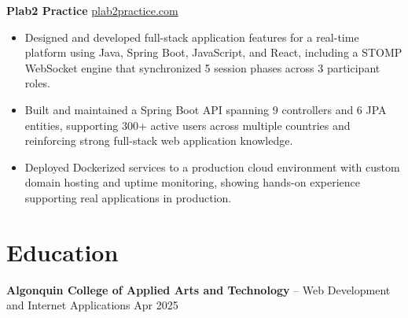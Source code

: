 \documentclass[11pt]{article}       %
\begin{document}
\textbf{Plab2 Practice} \hfill \href{https://plab2practice.com}{plab2practice.com} \\
\vspace{-9pt}
\begin{itemize}
  \item Designed and developed full-stack application features for a real-time platform using Java, Spring Boot, JavaScript, and React, including a STOMP WebSocket engine that synchronized 5 session phases across 3 participant roles.
  \item Built and maintained a Spring Boot API spanning 9 controllers and 6 JPA entities, supporting 300+ active users across multiple countries and reinforcing strong full-stack web application knowledge.
  \item Deployed Dockerized services to a production cloud environment with custom domain hosting and uptime monitoring, showing hands-on experience supporting real applications in production.
\end{itemize}





\section*{Education}
\textbf{Algonquin College of Applied Arts and Technology} -- Web Development and Internet Applications
\hfill Apr 2025 \\
\end{document}
